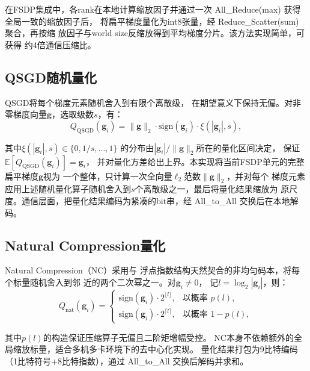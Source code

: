 在FSDP集成中，各rank在本地计算缩放因子并通过一次 All\_Reduce(max) 
获得全局一致的缩放因子后，
将扁平梯度量化为int8张量，经 Reduce\_Scatter(sum) 聚合，再按缩
放因子与world size反缩放得到平均梯度分片。该方法实现简单，可获得
约4倍通信压缩比。

\subsection{QSGD随机量化}

QSGD\cite{alistarh2017qsgd}将每个梯度元素随机舍入到有限个离散级，
在期望意义下保持无偏。对非零梯度向量$\mathbf{g}$，选取级数$s$，有：
\begin{equation}
Q_{\text{QSGD}}(\mathbf{g}_i) = \|\mathbf{g}\|_2 \cdot \text{sign}(\mathbf{g}_i) \cdot \xi(|\mathbf{g}_i|, s),
\label{eq:qsgd}
\end{equation}

其中$\xi(|\mathbf{g}_i|, s) \in \{0, 1/s, \ldots, 1\}$
的分布由$|\mathbf{g}_i|/\|\mathbf{g}\|_2$所在的量化区间决定，
保证$\mathbb{E}[Q_{\text{QSGD}}(\mathbf{g}_i)] = \mathbf{g}_i$，
并对量化方差给出上界。本实现将当前FSDP单元的完整扁平梯度$\mathbf{g}$视为
一个整体，只计算一次全向量$\ell_2$范数$\|\mathbf{g}\|_2$，并对每个
梯度元素应用上述随机量化算子随机舍入到$s$个离散级之一，最后将量化结果缩放为
原尺度。通信层面，把量化结果编码为紧凑的bit串，经 All\_to\_All 交换后在本地解码。

\subsection{Natural Compression量化}

Natural Compression（NC）\cite{horvath2022nc}采用与
浮点指数结构天然契合的非均匀码本，将每个标量随机舍入到邻
近的两个二次幂之一。对$\mathbf{g}_i \ne 0$，
记$l = \log_2 |\mathbf{g}_i|$，则：
\begin{equation}
Q_{\text{nat}}(\mathbf{g}_i) = \begin{cases}
\text{sign}(\mathbf{g}_i) \cdot 2^{\lfloor l \rfloor}, & \text{以概率~} p(l), \\
\text{sign}(\mathbf{g}_i) \cdot 2^{\lceil l \rceil}, & \text{以概率~} 1-p(l),
\end{cases}
\label{eq:nc}
\end{equation}

其中$p(l)$的构造保证压缩算子无偏且二阶矩增幅受控。
NC本身不依赖额外的全局缩放标量，适合多机多卡环境下的去中心化实现。
量化结果打包为9比特编码（1比特符号$+$8比特指数），通过 All\_to\_All 
交换后解码并求和。

